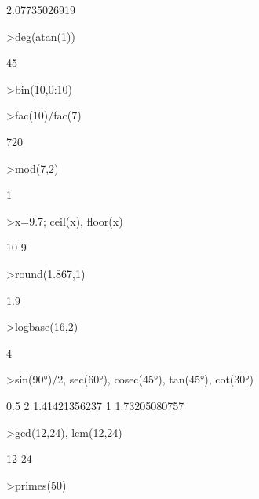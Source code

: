 \documentclass{article}
\begin{document}
\begin{eulernotebook}
\begin{eulercomment}
\begin{eulercomment}
\begin{euleroutput}
  2.07735026919
\end{euleroutput}
\begin{eulerprompt}
>deg(atan(1))
\end{eulerprompt}
\begin{euleroutput}
  45
\end{euleroutput}
\begin{eulerprompt}
>bin(10,0:10)
\end{eulerprompt}
\begin{euleroutput}
  [1,  10,  45,  120,  210,  252,  210,  120,  45,  10,  1]
\end{euleroutput}
\begin{eulerprompt}
>fac(10)/fac(7)
\end{eulerprompt}
\begin{euleroutput}
  720
\end{euleroutput}
\begin{eulerprompt}
>mod(7,2)
\end{eulerprompt}
\begin{euleroutput}
  1
\end{euleroutput}
\begin{eulerprompt}
>x=9.7; ceil(x), floor(x)
\end{eulerprompt}
\begin{euleroutput}
  10
  9
\end{euleroutput}
\begin{eulerprompt}
>round(1.867,1)
\end{eulerprompt}
\begin{euleroutput}
  1.9
\end{euleroutput}
\begin{eulerprompt}
>logbase(16,2)
\end{eulerprompt}
\begin{euleroutput}
  4
\end{euleroutput}
\begin{eulerprompt}
>sin(90°)/2, sec(60°), cosec(45°), tan(45°), cot(30°)
\end{eulerprompt}
\begin{euleroutput}
  0.5
  2
  1.41421356237
  1
  1.73205080757
\end{euleroutput}
\begin{eulerprompt}
>gcd(12,24), lcm(12,24)
\end{eulerprompt}
\begin{euleroutput}
  12
  24
\end{euleroutput}
\begin{eulerprompt}
>primes(50)

\end{eulerprompt}
\end{eulercomment}
\end{eulercomment}
\end{eulernotebook}
\end{document}

